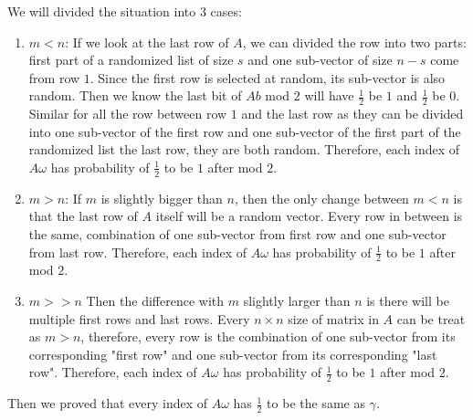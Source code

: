 \documentclass[11pt]{article}%
\begin{document}
\begin{questions}[1]
\begin{enumerate}[(a)]
    We will divided the situation into $3$ cases:
    \begin{enumerate}[($1$)]
        \item $m < n$: If we look at the last row of $A$, we can divided the row into two parts: first part of a randomized list of size $s$ and one sub-vector of size $n-s$ come from row $1$. Since the first row is selected at random, its sub-vector is also random. Then we know the last bit of $Ab$ mod $2$ will have $\frac{1}{2}$ be $1$ and $\frac{1}{2}$ be $0$. Similar for all the row between row $1$ and the last row as they can be divided into one sub-vector of the first row and one sub-vector of the first part of the randomized list the last row, they are both random. Therefore, each index of $A\omega$ has probability of $\frac{1}{2}$ to be $1$ after mod $2$.  
        \item $m > n$: If $m$ is slightly bigger than $n$, then the only change between $m<n$ is that the last row of $A$ itself will be a random vector. Every row in between is the same, combination of one sub-vector from first row and one sub-vector from last row. Therefore, each index of $A\omega$ has probability of $\frac{1}{2}$ to be $1$ after mod $2$. 
        \item $m >> n$ Then the difference with $m$ slightly larger than $n$ is there will be multiple first rows and last rows. Every $n \times n$ size of matrix in $A$ can be treat as $m>n$, therefore, every row is the combination of one sub-vector from its corresponding "first row" and one sub-vector from its corresponding "last row". Therefore, each index of $A\omega$ has probability of $\frac{1}{2}$ to be $1$ after mod $2$.
    \end{enumerate}
    Then we proved that every index of $A\omega$ has $\frac{1}{2}$ to be the same as $\gamma$.
    
    \newline
    

\end{enumerate}
\end{questions}
\end{document}
